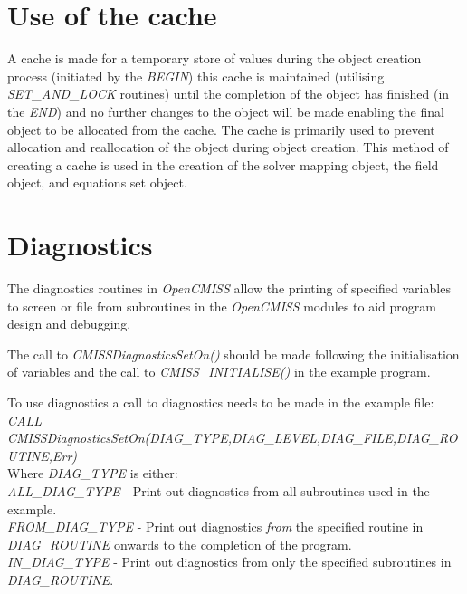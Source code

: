 \section{Use of the cache}
\label{sec:cache}

A cache is made for a temporary store of values during the object creation
process (initiated by the \emph{BEGIN}) this cache is maintained (utilising 
\emph{SET\_AND\_LOCK} routines) until the completion of the object has 
finished (in the \emph{END}) and no further changes to the object will be 
made enabling the final object to be allocated from the cache. The cache is 
primarily used to prevent allocation and reallocation of the object during 
object creation. This method of creating a cache is used in the creation of 
the solver mapping object, the field object, and equations set object.


\section{Diagnostics}
\label{sec:diagnostics}

The diagnostics routines in \emph{OpenCMISS} allow the printing of specified 
variables to screen or file from subroutines in the \emph{OpenCMISS} modules 
to aid program design and debugging.

The call to \emph{CMISSDiagnosticsSetOn()} should be made following the 
initialisation of variables and the call to \emph{CMISS\_INITIALISE()} in the
example program.

To use diagnostics a call to diagnostics needs to be made in the example file:
\\
\linebreak
\emph{CALL
CMISSDiagnosticsSetOn(DIAG\_TYPE,DIAG\_LEVEL,DIAG\_FILE,DIAG\_ROUTINE,Err)} \\ 
\linebreak
\noindent Where \emph{DIAG\_TYPE} is either: \\

\noindent \emph{ALL\_DIAG\_TYPE} - Print out diagnostics from all subroutines 
used in the example. \\
\emph{FROM\_DIAG\_TYPE} - Print out diagnostics \emph{from} the specified 
routine in 
\\ \emph{DIAG\_ROUTINE} onwards to the completion of the program. \\
\emph{IN\_DIAG\_TYPE} - Print out diagnostics from only the specified 
subroutines in \emph{DIAG\_ROUTINE}. \\
\linebreak

